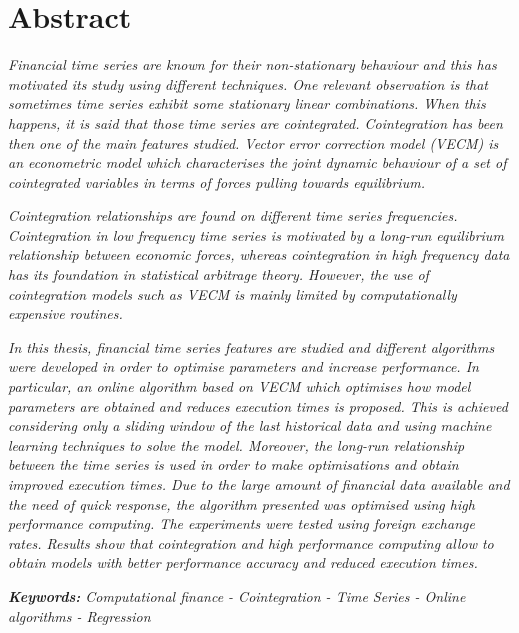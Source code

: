 \chapter*{Abstract}

\emph{Financial time series are known for their non-stationary behaviour and
this has motivated its study using different techniques. 
One relevant observation is that sometimes time series exhibit some stationary
linear combinations. When this happens, it is said that those time series are
cointegrated. Cointegration has been then one of the main features studied.
Vector error correction model (VECM) is an econometric model which characterises
the joint dynamic behaviour of a set of cointegrated variables in terms of
forces pulling towards equilibrium.}

\emph{Cointegration relationships are found on different time series
frequencies. Cointegration in low frequency time series is motivated by a
long-run equilibrium relationship between economic forces, whereas cointegration
in high frequency data has its foundation in statistical arbitrage theory.
However, the use of cointegration models such as VECM is mainly limited by
computationally expensive routines.}

\emph{In this thesis, financial time series features are studied and different
algorithms were developed in order to optimise parameters and increase
performance.  In particular, an online algorithm based on VECM which optimises
how model parameters are obtained and reduces execution times is proposed. This
is achieved considering only a sliding window of the last historical data and
using machine learning techniques to solve the model. Moreover, the long-run
relationship between the time series is used in order to make optimisations and
obtain improved execution times.  Due to the large amount of financial data
available and the need of quick response, the algorithm presented was optimised
using high performance computing. The experiments were tested using foreign
exchange rates.  Results show that cointegration and high performance computing
allow to obtain models with better performance accuracy and reduced execution
times.}

\vspace{0.8cm}

\emph{\textbf{Keywords:} Computational finance  - Cointegration  - Time Series - 
Online algorithms  - Regression}


